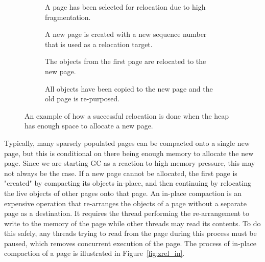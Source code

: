 \begin{figure}[H]
    \centering
    \begin{subfigure}[t]{.2\textwidth}
        \centering
        
        \caption{A page has been selected for relocation due to high fragmentation.}
        \label{fig:zrel_new1}
    \end{subfigure}
    \hfill\vline\hfill
    \begin{subfigure}[t]{.2\textwidth}
        \centering
        
        \caption{A new page is created with a new sequence number that is used as a relocation target.}
        \label{fig:zrel_new2}
    \end{subfigure}
    \hfill\vline\hfill
    \begin{subfigure}[t]{.2\textwidth}
        \centering
        
        \caption{The objects from the first page are relocated to the new page.}
        \label{fig:zrel_new3}
    \end{subfigure}
    \hfill\vline\hfill
    \begin{subfigure}[t]{.2\textwidth}
        \centering
        
        \caption{All objects have been copied to the new page and the old page is re-purposed.}
        \label{fig:zrel_new3}
    \end{subfigure}
    \caption{An example of how a successful relocation is done when the heap has enough space to allocate a new page.}
    \label{fig:zrel_new}
\end{figure}

Typically, many sparsely populated pages can be compacted onto a single new page, but this is conditional on there being enough memory to allocate the new page. Since we are starting GC as a reaction to high memory pressure, this may not always be the case. If a new page cannot be allocated, the first page is "created" by compacting its objects in-place, and then continuing by relocating the live objects of other pages onto that page. An in-place compaction is an expensive operation that re-arranges the objects of a page without a separate page as a destination. It requires the thread performing the re-arrangement to write to the memory of the page while other threads may read its contents. To do this safely, any threads trying to read from the page during this process must be paused, which removes concurrent execution of the page. The process of in-place compaction of a page is illustrated in Figure~\ref{fig:zrel_in}.

